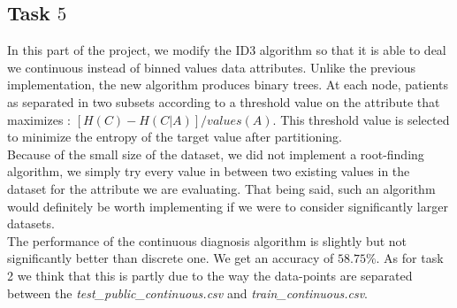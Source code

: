 \documentclass[french]{article}
\begin{document}
\subsection{Task $5$}

In this part of the project, we modify the ID3 algorithm so that it is able to deal we continuous instead of binned values data attributes. Unlike the previous implementation, the new algorithm produces binary trees. At each node, patients as separated in two subsets according to a threshold value on the attribute that maximizes : $[H(C) - H(C|A)] / {values(A)}$. This threshold value is selected to minimize the entropy of the target value after partitioning. \\
Because of the small size of the dataset, we did not implement a root-finding algorithm, we simply try every value in between two existing values in the dataset for the attribute we are evaluating. That being said, such an algorithm would definitely be worth implementing if we were to consider significantly larger datasets. \\
The performance of the continuous diagnosis algorithm is slightly but not significantly better than discrete one. We get an accuracy of $58.75\%$. As for task 2 we think that this is partly due to the way the data-points are separated between the \emph{test\_public\_continuous.csv} and \emph{train\_continuous.csv}. 
\end{document}
